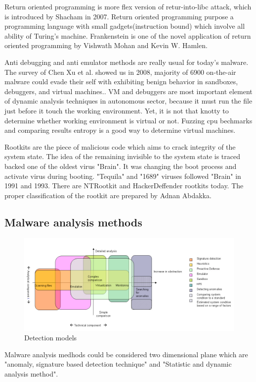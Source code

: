 Return oriented programming is more flex version of retur-into-libc attack, which is introduced by Shacham in 2007\cite{shacham2007geometry}. Return oriented programming purpose a programming language with small gadgets(instruction bound) which involve all ability of Turing's machine\cite{roemer2012return}. Frankenstein is one of the novel application of return oriented programming by Vishwath Mohan and Kevin W. Hamlen\cite{mohan2012frankenstein}.

Anti debugging and anti emulator methods are really usual for today's malware. The survey of Chen Xu et al. showed us in 2008, majority of 6900 on-the-air malware could evade their self with exhibiting benign behavior in sandboxes, debuggers, and virtual machines.\cite{chen2008towards}. VM and debuggers are most important element of dynamic analysis techniques in autonomous sector, because it must run the file just before it touch the working environment. Yet, it is not that knotty to determine whether working environment is virtual or not. Fuzzing cpu bechmarks and comparing results entropy is a good way to determine virtual machines.\cite{franklin2008remote}

Rootkits are the piece of malicious code which aims to crack integrity of the system state. The idea of the remaining invisible to the system state is traced backed one of the oldest virus "Brain"\cite{martin2008}. It was changing the boot process and activate virus during booting. "Tequila" and "1689" viruses followed "Brain" in 1991 and 1993\cite{Ducklin1991}. There are NTRootkit and HackerDeffender rootkits today. The proper classification of the rootkit are prepared by Adnan Abdakka\cite{Adnan2011}.



\subsection{Malware analysis methods}

\begin{figure}[h]
    \centering
    \includegraphics[width=1\textwidth]{alisa_1007_pic1_en.jpg}
    \caption{Detection models \cite{Shevchenko2007detc}}
    \label{fig:awesome_image}
\end{figure}
Malware analysis medhods could be considered two dimensional plane which are "anomaly, signature based detection technique" and "Statistic and dynamic analysis method". 



